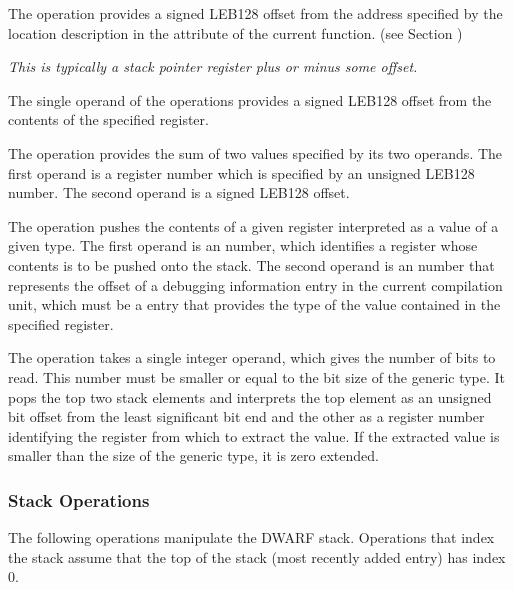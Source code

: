 \begin{enumerate}[1. ]
  \itembfnl{\DWOPfbregTARG}
The \DWOPfbregNAME{} operation provides a signed
LEB128 offset from the address specified by
the location description in the \DWATframebase{} attribute of the
current function. (see Section )
 
\textit{This is typically a stack pointer register plus or minus some offset.}

\itembfnl{\DWOPbregzeroTARG, \DWOPbregoneTARG, \dots, \DWOPbregthirtyoneTARG}
The single operand of the \DWOPbregnTARG{} 
operations provides
a signed LEB128 offset from
the contents of the specified register.

\itembfnl{\DWOPbregxTARG}
The \DWOPbregxNAME{} operation provides the sum of two values specified
by its two operands. The first operand is a register number
which is specified by an unsigned LEB128
number. The second operand is a signed LEB128 offset.

\itembfnl{\DWOPregvaltypeTARG}
The \DWOPregvaltypeNAME{} operation 
\bb
pushes 
\eb
the contents of
a given register interpreted as a value of a given type. The first 
operand is an \ULEB{} number, 
which identifies a register whose contents is to
be pushed onto the stack. The second operand is an \ULEB{} number
that represents the offset of a debugging information entry in the current
compilation unit, which must be a \DWTAGbasetype{} entry that provides the
type of the value contained in the specified register.

\bb
\itembfnl{\DWOPregvalbitsTARG}
The \DWOPregvalbitsNAME{} operation takes a single \ULEB{}
integer operand, which gives the number of bits to read. This number must
be smaller or equal to the bit size of the generic type.  It pops
the top two stack elements and interprets the top element as an
unsigned bit offset from the least significant bit end and the
other as a register number identifying the register from which to
extract the value.  If the extracted value is smaller than the size
of the generic type, it is zero extended.
\eb

\end{enumerate}

\subsubsection{Stack Operations}
\label{chap:stackoperations}
The following 
operations manipulate the DWARF stack. Operations
that index the stack assume that the top of the stack (most
recently added entry) has index 0.

